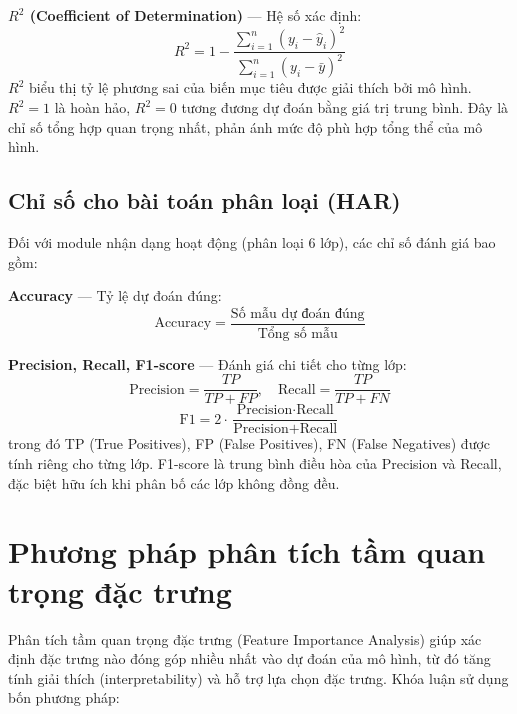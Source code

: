 \textbf{$R^2$ (Coefficient of Determination)} — Hệ số xác định:
\begin{equation}
    R^2 = 1 - \frac{\sum_{i=1}^{n}(y_i - \hat{y}_i)^2}{\sum_{i=1}^{n}(y_i - \bar{y})^2}
\end{equation}
$R^2$ biểu thị tỷ lệ phương sai của biến mục tiêu được giải thích bởi mô hình. $R^2 = 1$ là hoàn hảo, $R^2 = 0$ tương đương dự đoán bằng giá trị trung bình. Đây là chỉ số tổng hợp quan trọng nhất, phản ánh mức độ phù hợp tổng thể của mô hình.

\subsection{Chỉ số cho bài toán phân loại (HAR)}

Đối với module nhận dạng hoạt động (phân loại 6 lớp), các chỉ số đánh giá bao gồm:

\textbf{Accuracy} — Tỷ lệ dự đoán đúng:
\begin{equation}
    \text{Accuracy} = \frac{\text{Số mẫu dự đoán đúng}}{\text{Tổng số mẫu}}
\end{equation}

\textbf{Precision, Recall, F1-score} — Đánh giá chi tiết cho từng lớp:
\begin{equation}
    \text{Precision} = \frac{TP}{TP + FP}, \quad \text{Recall} = \frac{TP}{TP + FN}
\end{equation}
\begin{equation}
    \text{F1} = 2 \cdot \frac{\text{Precision} \cdot \text{Recall}}{\text{Precision} + \text{Recall}}
\end{equation}
trong đó TP (True Positives), FP (False Positives), FN (False Negatives) được tính riêng cho từng lớp. F1-score là trung bình điều hòa của Precision và Recall, đặc biệt hữu ích khi phân bố các lớp không đồng đều.


\section{Phương pháp phân tích tầm quan trọng đặc trưng}
\label{sec:feature_importance}

Phân tích tầm quan trọng đặc trưng (Feature Importance Analysis) giúp xác định đặc trưng nào đóng góp nhiều nhất vào dự đoán của mô hình, từ đó tăng tính giải thích (interpretability) và hỗ trợ lựa chọn đặc trưng. Khóa luận sử dụng bốn phương pháp:

